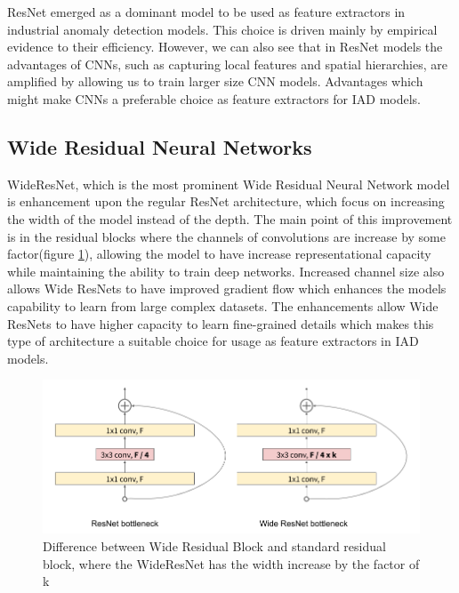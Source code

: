 ResNet\cite{resnet} emerged as a dominant model to be used as feature extractors in industrial anomaly detection models. This choice is driven mainly by empirical evidence to their efficiency. However, we can also see that in ResNet\cite{resnet} models the advantages of CNNs, such as capturing local features and spatial hierarchies, are amplified by allowing us to train larger size CNN models. Advantages which might make CNNs a preferable choice as feature extractors for IAD models.

\subsection{Wide Residual Neural Networks}
\label{wideresnet}
WideResNet, which is the most prominent Wide Residual Neural Network model\cite{wideresnet} is enhancement upon the regular ResNet architecture, which focus on increasing the width of the model instead of the depth. The main point of this improvement is in the residual blocks where the channels of convolutions are increase by some factor(figure \ref{fig:wide_resnet}), allowing the model to have increase representational capacity while maintaining the ability to train deep networks\cite{wideresnet}. Increased channel size also allows Wide ResNets to have improved gradient flow which enhances the models capability to learn from large complex datasets. The enhancements allow Wide ResNets to have higher capacity to learn fine-grained details which makes this type of architecture a suitable choice for usage as feature extractors in IAD models.

\begin{figure}[t]
	\begin{center}
		\includegraphics[width=1.0\linewidth]{Chapter_2/wide_resnet.png}
	\end{center}
	\caption{Difference between Wide Residual Block and standard residual block, where the WideResNet has the width increase by the factor of k\cite{wideresnet}\cite{pytorch_wide}}
	\label{fig:wide_resnet}
\end{figure}

